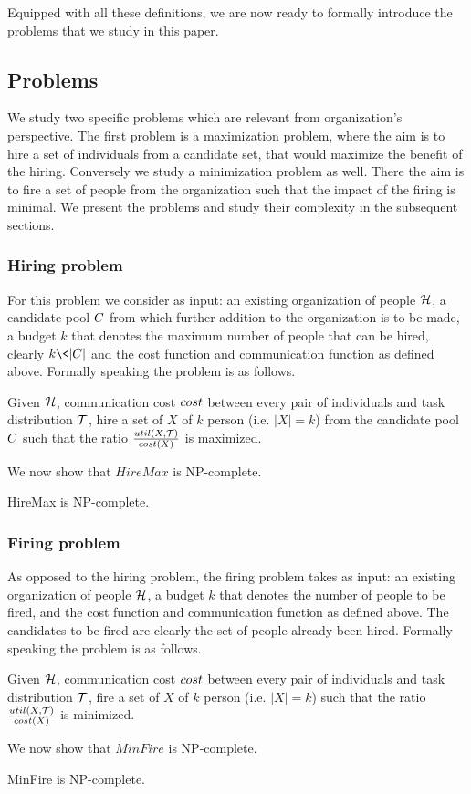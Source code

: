 Equipped with all these definitions, we are now ready to formally introduce the problems that we study in this paper.

\subsection{Problems}


We study two specific problems which are relevant from organization's perspective. The first problem is a maximization problem, where the aim is to hire a set of individuals from a candidate set, that would maximize the benefit of the hiring. Conversely we study a minimization problem as well. There the aim is to fire a set of people from the organization such that the impact of the firing is minimal. We present the problems and study their complexity in the subsequent sections.

\subsubsection{Hiring problem}

For this problem we consider as input: an existing organization of people $\mathcal{H}$, a candidate pool ${C}$ from which further addition to the organization is to be made, a budget $k$ that denotes the maximum number of people that can be hired, clearly $k \< |\candidates|$ and the cost function and communication function as defined above. Formally speaking the problem is as follows.  
\begin{problem}
[HireMax] Given $\mathcal{H}$, communication cost $cost$ between every pair of individuals and task distribution $\mathcal{T}$, hire a set of $X$ of $k$ person (i.e. $|X| = k$) from the candidate pool ${C}$ such that the ratio $\frac{{util}(X, \mathcal{T})}{cost(X)}$ is maximized.
\end{problem}

We now show that $HireMax$ is NP-complete.
\begin{theorem}
HireMax is NP-complete.
\end{theorem}



\subsubsection{Firing problem}

As opposed to the hiring problem, the firing problem takes as input: an existing organization of people $\mathcal{H}$, a budget $k$ that denotes the number of people to be fired, and the cost function and communication function as defined above. The candidates to be fired are clearly the set of people already been hired. Formally speaking the problem is as follows.  
\begin{problem}
[MinFire] Given $\mathcal{H}$, communication cost $cost$ between every pair of individuals and task distribution $\mathcal{T}$, fire a set of $X$ of $k$ person (i.e. $|X| = k$) such that the ratio $\frac{{util}(X, \mathcal{T})}{cost(X)}$ is minimized.
\end{problem}

We now show that $MinFire$ is NP-complete.
\begin{theorem}
MinFire is NP-complete.
\end{theorem}
